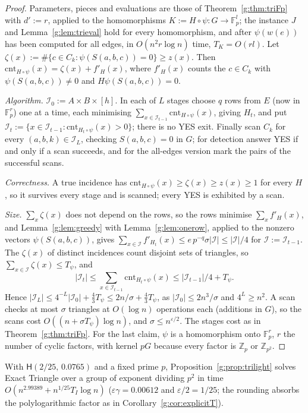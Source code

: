 \documentclass[11pt]{article}
\theoremstyle{definition}
\theoremstyle{remark}
\newcommand{\Z}{\mathbb{Z}}
\newcommand{\Fp}{\mathbb{F}_p}
\newcommand{\eps}{\varepsilon}
\newcommand{\cnt}{\mathrm{cnt}}
\newcommand{\Iq}{\mathcal{I}}
\newcommand{\Hyp}{\mathsf{H}}
\newcommand{\EpsGammaBest}{0.00612}%
\newcommand{\HypPrunedEps}{2/25}%
\newcommand{\HypPrunedGamma}{0.0765}%
\newcommand{\ExpTriBestUp}{2.99389}%
\begin{document}
\begin{proof}
Parameters, pieces and evaluations are those of Theorem~\ref{g:thm:triFp} with $d':=r$, applied to the homomorphisms $K:=H\circ\psi\colon G\to\Fp^l$; the instance $J$ and Lemma~\ref{g:lem:trieval} hold for every homomorphism, and after $\psi(w(e))$ has been computed for all edges, in $O(n^2r\log n)$ time, $T_K=O(rl)$. Let $\zeta(x):=\#\{c\in C_k:\psi(S(a,b,c))=0\}\ge z(x)$. Then $\cnt_{H\circ\psi}(x)=\zeta(x)+f'_H(x)$, where $f'_H(x)$ counts the $c\in C_k$ with $\psi(S(a,b,c))\ne0$ and $H\psi(S(a,b,c))=0$.

\emph{Algorithm.} $\Iq_0:=A\times B\times[h]$. In each of $L$ stages choose $q$ rows from $E$ (now in $\Fp^r$) one at a time, each minimising $\sum_{x\in\Iq_{t-1}}\cnt_{H\circ\psi}(x)$, giving $H_t$, and put $\Iq_t:=\{x\in\Iq_{t-1}:\cnt_{H_t\circ\psi}(x)>0\}$; there is no YES exit. Finally scan $C_k$ for every $(a,b,k)\in\Iq_L$, checking $S(a,b,c)=0$ in $G$; for detection answer YES if and only if a scan succeeds, and for the all-edges version mark the pairs of the successful scans.

\emph{Correctness.} A true incidence has $\cnt_{H\circ\psi}(x)\ge\zeta(x)\ge z(x)\ge1$ for every $H$, so it survives every stage and is scanned; every YES is exhibited by a scan.

\emph{Size.} $\sum_x\zeta(x)$ does not depend on the rows, so the rows minimise $\sum_xf'_H(x)$, and Lemma~\ref{g:lem:greedy} with Lemma~\ref{g:lem:onerow}, applied to the nonzero vectors $\psi(S(a,b,c))$, gives $\sum_{x\in\Iq}f'_{H_t}(x)\le e\,p^{-q}\sigma|\Iq|\le|\Iq|/4$ for $\Iq:=\Iq_{t-1}$. The $\zeta(x)$ of distinct incidences count disjoint sets of triangles, so $\sum_{x\in\Iq}\zeta(x)\le T_\psi$, and
\[
|\Iq_t|\le\sum_{x\in\Iq_{t-1}}\cnt_{H_t\circ\psi}(x)\le|\Iq_{t-1}|/4+T_\psi .
\]
Hence $|\Iq_L|\le4^{-L}|\Iq_0|+\frac43T_\psi\le2n/\sigma+\frac43T_\psi$, as $|\Iq_0|\le2n^3/\sigma$ and $4^L\ge n^2$. A scan checks at most $\sigma$ triangles at $O(\log n)$ operations each (additions in $G$), so the scans cost $O((n+\sigma T_\psi)\log n)$, and $\sigma\le n^{\eps/2}$. The stages cost as in Theorem~\ref{g:thm:triFp}. For the last claim, $\psi$ is a homomorphism onto $\Fp^r$, $r$ the number of cyclic factors, with kernel $pG$ because every factor is $\Z_p$ or $\Z_{p^2}$.
\end{proof}

With $\Hyp(\HypPrunedEps,\,\HypPrunedGamma)$ and a fixed prime $p$, Proposition~\ref{g:prop:trilight} solves Exact Triangle over a group of exponent dividing $p^2$ in time $O(n^{\ExpTriBestUp}+n^{1/25}T_I\log n)$ ($\eps\gamma=\EpsGammaBest$ and $\eps/2=1/25$; the rounding absorbs the polylogarithmic factor as in Corollary~\ref{g:cor:explicitT}).
\end{document}
